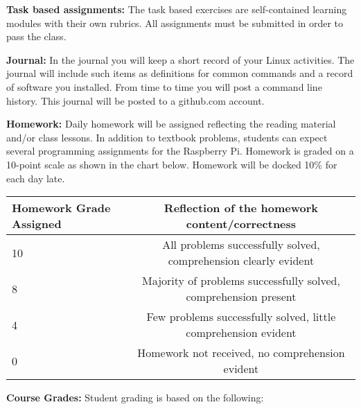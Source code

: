 \documentclass[12pt]{article}
\begin{document}
\vspace*{.15in}
\textbf{Task based assignments:}
The task based exercises are self-contained learning modules with their own rubrics. All assignments must be submitted in order to pass the class.


\vspace*{.15in}
\textbf{Journal:}
In the journal you will keep a short record of your Linux activities. The journal will include such items as definitions for common commands and a record of software you installed. From time to time you will post a command line history. This journal will be posted to a github.com account.



\vspace*{.15in}
\textbf{Homework:}  Daily homework will be assigned reflecting the reading material and/or class lessons.  In addition to textbook problems, students can expect several programming assignments for the Raspberry Pi.  Homework is graded on a 10-point scale as shown in the chart below.  Homework will be docked 10\% for each day late.

    \begin{center}
        \begin{tabular}{ | l | c | }
            \hline
            \textbf{Homework Grade Assigned} & \textbf{Reflection of the homework content/correctness} \\ \hline
            10 & All problems successfully solved, comprehension clearly evident\\ \hline
            8 & Majority of problems successfully solved, comprehension present\\ \hline
            4 & Few problems successfully solved, little comprehension evident \\ \hline
            0 &  Homework not received, no comprehension evident\\
            \hline
        \end{tabular}
    \end{center}




\newpage
\vspace*{.15in}
\noindent\textbf{Course Grades:} Student grading is based on the following:
\end{document}
